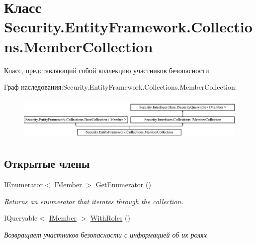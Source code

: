 \hypertarget{class_security_1_1_entity_framework_1_1_collections_1_1_member_collection}{}\section{Класс Security.\+Entity\+Framework.\+Collections.\+Member\+Collection}
\label{class_security_1_1_entity_framework_1_1_collections_1_1_member_collection}


Класс, представляющий собой коллекцию участников безопасности  


Граф наследования\+:Security.\+Entity\+Framework.\+Collections.\+Member\+Collection\+:\begin{figure}[H]
\begin{center}
\leavevmode
\includegraphics[height=2.159383cm]{db/d00/class_security_1_1_entity_framework_1_1_collections_1_1_member_collection}
\end{center}
\end{figure}
\subsection*{Открытые члены}
\begin{DoxyCompactItemize}
\item 
I\+Enumerator$<$ \hyperlink{interface_security_1_1_interfaces_1_1_model_1_1_i_member}{I\+Member} $>$ \hyperlink{class_security_1_1_entity_framework_1_1_collections_1_1_member_collection_a16b0d5551a1ef1f8b4d64e3006e91569}{Get\+Enumerator} ()
\begin{DoxyCompactList}\small\item\em Returns an enumerator that iterates through the collection. \end{DoxyCompactList}\item 
I\+Queryable$<$ \hyperlink{interface_security_1_1_interfaces_1_1_model_1_1_i_member}{I\+Member} $>$ \hyperlink{class_security_1_1_entity_framework_1_1_collections_1_1_member_collection_a64f05448c3237c110809d01105b8731c}{With\+Roles} ()
\begin{DoxyCompactList}\small\item\em Возвращает участников безопасности с информацией об их ролях \end{DoxyCompactList}\end{DoxyCompactItemize}
